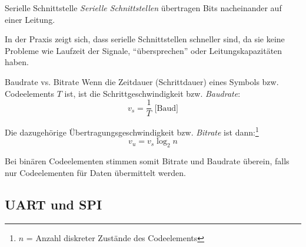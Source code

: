 \begin{defi}{Serielle Schnittstelle}
    \emph{Serielle Schnittstellen} übertragen Bits nacheinander auf einer Leitung.

    In der Praxis zeigt sich, dass serielle Schnittstellen schneller sind, da sie keine Probleme wie Laufzeit der Signale, \enquote{übersprechen} oder Leitungskapazitäten haben.
\end{defi}

\begin{bonus}{Baudrate vs. Bitrate}
    Wenn die Zeitdauer (Schrittdauer) eines Symbols bzw. Codeelements $T$ ist, ist die Schrittgeschwindigkeit bzw. \emph{Baudrate}:
    \[
        v_s = \frac{1}{T} \text{ [Baud]}
    \]

    Die dazugehörige Übertragungsgeschwindigkeit bzw. \emph{Bitrate} ist dann:\footnote{$n$ = Anzahl diskreter Zustände des Codeelements}
    \[
        v_u = v_s \log_2 n
    \]

    Bei binären Codeelementen stimmen somit Bitrate und Baudrate überein, falls nur Codeelementen für Daten übermittelt werden.
\end{bonus}

\subsection{UART und SPI}


